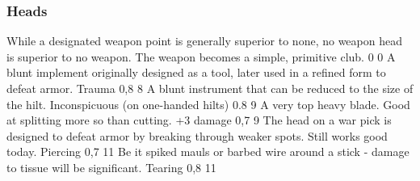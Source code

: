 \subsubsection{Heads}
\vspace{8mm}
\begin{multicols}{2}
    {While a designated weapon point is generally superior to none,
        no weapon head is superior to no weapon.}
    {The weapon becomes a simple, primitive club.}
    {0}
    {0}
    {}
    {A blunt implement originally designed as a tool,
        later used in a refined form to defeat armor.}
    {Trauma}
    {0,8}
    {8}
    {}
	{A blunt instrument that can be reduced to the size of the hilt.}
	{Inconspicuous (on one-handed hilts)}
	{0.8}
	{9}
	{}
    {A very top heavy blade.
        Good at splitting more so than cutting.}
    {+3 damage}
    {0,7}
    {9}
    {}
    {The head on a war pick is designed to defeat armor by breaking through weaker spots.
        Still works good today.}
    {Piercing}
    {0,7}
    {11}
    {}
    {Be it spiked mauls or barbed wire around a stick
        - damage to tissue will be significant.}
    {Tearing}
    {0,8}
    {11}
    {}
\end{multicols}

